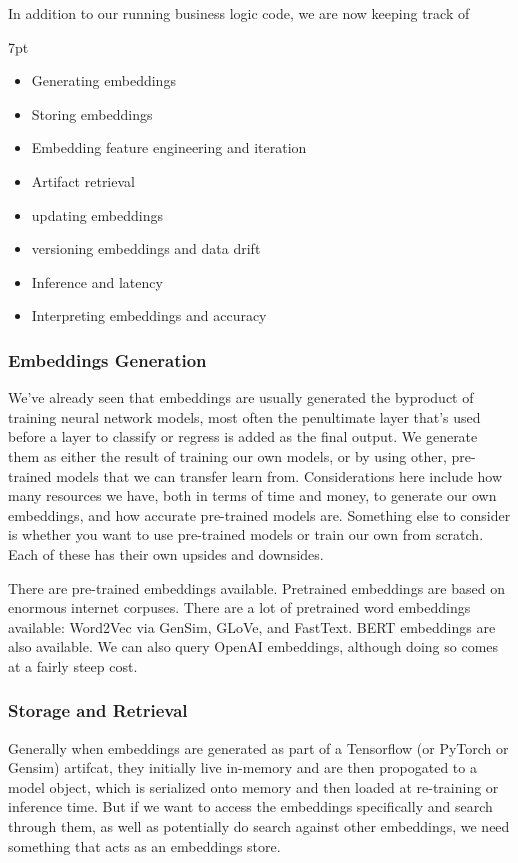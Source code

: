 \documentclass[11pt, table]{diazessay} %
\newenvironment{formal}{%
  \def\FrameCommand{%
    \hspace{1pt}%
    {\color{w_lightblue}\vrule width 2pt}%
    {\color{formalshade}\vrule width 4pt}%
    \colorbox{formalshade}%
  }%
  \MakeFramed{\advance\hsize-\width\FrameRestore}%
  \noindent\hspace{-4.55pt}%
  \begin{adjustwidth}{}{7pt}%
  \vspace{2pt}\vspace{2pt}%
}
{%
  \vspace{2pt}\end{adjustwidth}\endMakeFramed%
}
\begin{document}
\begin{sloppypar}
In addition to our running business logic code, we are now keeping track of

\begin{formal}
\begin{itemize}
  \item Generating embeddings 
  \item Storing embeddings
  \item Embedding feature engineering and iteration
  \item Artifact retrieval
  \item updating embeddings 
  \item versioning embeddings and data drift
  \item Inference and latency
  \item Interpreting embeddings and accuracy
\end{itemize}
\end{formal}

\subsubsection{Embeddings Generation}

We've already seen that embeddings are usually generated the byproduct of training neural network models, most often the penultimate layer that's used before a layer to classify or regress is added as the final output. We generate them as either the result of training our own models, or by using other, pre-trained models that we can transfer learn from. Considerations here include how many resources we have, both in terms of time and money, to generate our own embeddings, and how accurate pre-trained models are. Something else to consider is whether you want to use pre-trained models or train our own from scratch. Each of these has their own upsides and downsides. 

There are pre-trained embeddings available.  Pretrained embeddings are based on enormous internet corpuses.  There are a lot of pretrained word embeddings available: Word2Vec via GenSim, GLoVe, and FastText. BERT embeddings are also available.  We can also query OpenAI embeddings, although doing so comes at a fairly steep cost.

\subsubsection{Storage and Retrieval}

Generally when embeddings are generated as part of a Tensorflow (or PyTorch or Gensim) artifcat, they initially live in-memory and are then propogated to a model object, which is serialized onto memory and then loaded at re-training or inference time. But if we want to access the embeddings specifically and search through them, as well as potentially do search against other embeddings, we need something that acts as an embeddings store.




\end{sloppypar}
\end{document}
